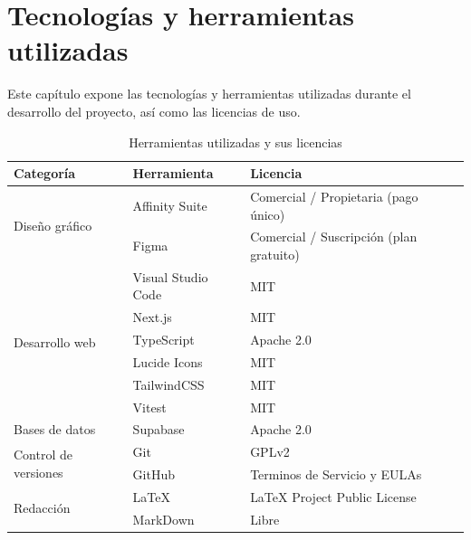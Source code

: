 \chapter{Tecnologías y herramientas utilizadas}
\label{c:tecyher}

Este capítulo expone las tecnologías y herramientas utilizadas durante el desarrollo del proyecto, así como las licencias de uso.


\begin{table}[H]
    \centering
    \caption{Herramientas utilizadas y sus licencias}
    \small
    \begin{tabular}{l l l}
    \hline
    \textbf{Categoría} & \textbf{Herramienta} & \textbf{Licencia} \\
    \hline
    \multirow{2}{*}{Diseño gráfico} & Affinity Suite & Comercial / Propietaria (pago único)~\cite{affinity_license} \\
                                   & Figma             & Comercial / Suscripción (plan gratuito)~\cite{figma_license} \\
    \hline
    \multirow{6}{*}{Desarrollo web} & Visual Studio Code & MIT~\cite{vscode_license} \\
    & Next.js           & MIT~\cite{nextjs_license} \\
    & TypeScript           & Apache 2.0~\cite{typescript_license} \\
    & Lucide Icons           & MIT~\cite{lucide_license} \\
    & TailwindCSS           & MIT~\cite{tailwindcss_license} \\
    & Vitest           & MIT~\cite{vitest_license} \\
    \hline
    Bases de datos & Supabase & Apache 2.0~\cite{supabase_license} \\
    \hline
    \multirow{2}{*}{Control de versiones} & Git      & GPLv2~\cite{git_license} \\
     & GitHub   & Terminos de Servicio y EULAs~\cite{github_license} \\
    \hline
    \multirow{2}{*}{Redacción} & LaTeX             & LaTeX Project Public License~\cite{latex_license} \\
     & MarkDown             & Libre~\cite{markdown} \\
    \hline
    \end{tabular}
    \label{tab:herramientas_licencias}
\end{table}


